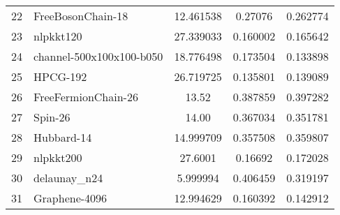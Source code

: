 \begin{tabular}{|l|l|S[round-mode=places,round-precision=2]|S[round-mode=places,round-precision=4]|S[round-mode=places,round-precision=4]|}
{22}& {	FreeBosonChain-18         }	& 12.461538	& 0.27076	& 0.262774	\\
{23}& {	nlpkkt120                 }	& 27.339033	& 0.160002	& 0.165642	\\
{24}& {	channel-500x100x100-b050  }	& 18.776498	& 0.173504	& 0.133898	\\
{25}& {	HPCG-192                  }	& 26.719725	& 0.135801	& 0.139089	\\
{26}& {	FreeFermionChain-26       }	& 13.52	& 0.387859	& 0.397282	\\
{27}& {	Spin-26                   }	& 14.00	& 0.367034	& 0.351781	\\
{28}& {	Hubbard-14                }	& 14.999709	& 0.357508	& 0.359807	\\
{29}& {	nlpkkt200                 }	& 27.6001	& 0.16692	& 0.172028	\\
{30}& {	delaunay\_n24              }	& 5.999994	& 0.406459	& 0.319197	\\
{31}& {	Graphene-4096             }	& 12.994629	& 0.160392	& 0.142912	\\
\bottomrule
\end{tabular}


